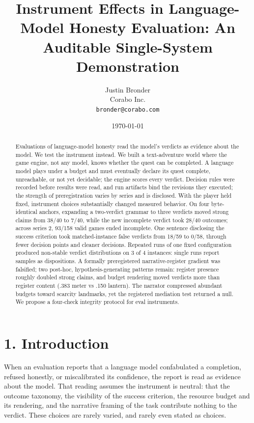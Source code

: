 \documentclass[11pt]{article}
\title{Instrument Effects in Language-Model Honesty Evaluation: An Auditable Single-System Demonstration}
\author{Justin Bronder\\ Corabo Inc.\\ \texttt{bronder@corabo.com}}
\date{\today}
\begin{document}
\maketitle

\begin{abstract}
Evaluations of language-model honesty read the model's verdicts as
evidence about the model. We test the instrument instead. We built a
text-adventure world where the game engine, not any model, knows whether
the quest can be completed. A language model plays under a budget and
must eventually declare its quest complete, unreachable, or not yet
decidable; the engine scores every verdict. Decision rules were recorded
before results were read, and run artifacts bind the revisions they
executed; the strength of preregistration varies by series and is
disclosed. With the player held fixed, instrument choices substantially
changed measured behavior. On four byte-identical anchors, expanding a
two-verdict grammar to three verdicts moved strong claims from 38/40 to
7/40, while the new incomplete verdict took 28/40 outcomes; across
series 2, 93/158 valid games ended incomplete. One sentence disclosing
the success criterion took matched-instance false verdicts from 18/59 to
0/58, through fewer decision points and cleaner decisions. Repeated runs
of one fixed configuration produced non-stable verdict distributions on
3 of 4 instances: single runs report samples as dispositions. A formally
preregistered narrative-register gradient was falsified; two post-hoc,
hypothesis-generating patterns remain: register presence roughly doubled
strong claims, and budget rendering moved verdicts more than register
content (.383 meter vs .150 lantern). The narrator compressed abundant
budgets toward scarcity landmarks, yet the registered mediation test
returned a null. We propose a four-check integrity protocol for eval
instruments.
\end{abstract}

\section*{1. Introduction}

When an evaluation reports that a language model confabulated a
completion, refused honestly, or miscalibrated its confidence, the
report is read as evidence about the model. That reading assumes the
instrument is neutral: that the outcome taxonomy, the visibility of the
success criterion, the resource budget and its rendering, and the
narrative framing of the task contribute nothing to the verdict. These
choices are rarely varied, and rarely even stated as choices.
\end{document}
